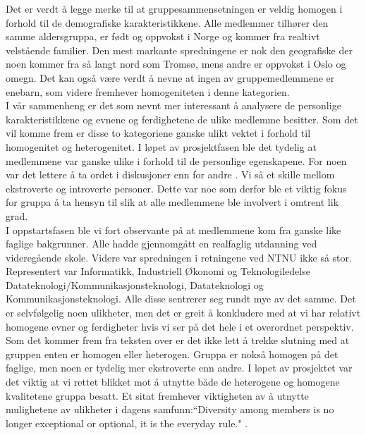 Det er verdt å legge merke til at gruppesammensetningen er veldig homogen i forhold til de demografiske karakteristikkene. Alle medlemmer tilhører den samme aldersgruppa, er født og oppvokst i Norge og kommer fra realtivt velstående familier. Den mest markante spredningene er nok den geografiske der noen kommer fra så langt nord som Tromsø, mens andre er oppvokst i Oslo og omegn. Det kan også være verdt å nevne at ingen av gruppemedlemmene er enebarn, som videre fremhever homogeniteten i denne kategorien.\\

I vår sammenheng er det som nevnt mer interessant å analysere de personlige karakteristikkene og evnene og ferdighetene de ulike medlemme besitter. Som det vil komme frem er disse to kategoriene ganske ulikt vektet i forhold til homogenitet og heterogenitet. I løpet av prosjektfasen ble det tydelig at medlemmene var ganske ulike i forhold til de personlige egenskapene. For noen var det lettere å ta ordet i diskusjoner enn for andre . Vi så et skille mellom ekstroverte og introverte personer. Dette var noe som derfor ble et viktig fokus for gruppa å ta hensyn til slik at alle medlemmene ble involvert i omtrent lik grad.\\

I oppstartsfasen ble vi fort observante på at medlemmene kom fra ganske like faglige bakgrunner. Alle hadde gjennomgått en realfaglig utdanning ved videregående skole. Videre var spredningen i retningene ved NTNU ikke så stor. Representert var Informatikk, Industriell Økonomi og Teknologiledelse Datateknologi/Kommunikasjonsteknologi, Datateknologi og Kommunikasjonsteknologi. Alle disse sentrerer seg rundt mye av det samme. Det er selvfølgelig noen ulikheter, men det er greit å konkludere med at vi har relativt homogene evner og ferdigheter hvis vi ser på det hele i et overordnet perspektiv.\\

Som det kommer frem fra teksten over er det ikke lett å trekke slutning med at gruppen enten er homogen eller heterogen. Gruppa er nokså homogen på det faglige, men noen er tydelig mer ekstroverte enn andre. I løpet av prosjektet var det viktig at vi rettet blikket mot å utnytte både de heterogene og homogene kvalitetene gruppa besatt. Et sitat fremhever viktigheten av å utnytte mulighetene av ulikheter i dagens samfunn:``Diversity among members is no longer exceptional or optional, it is the everyday rule." \cite{gruppeteori}.\\

